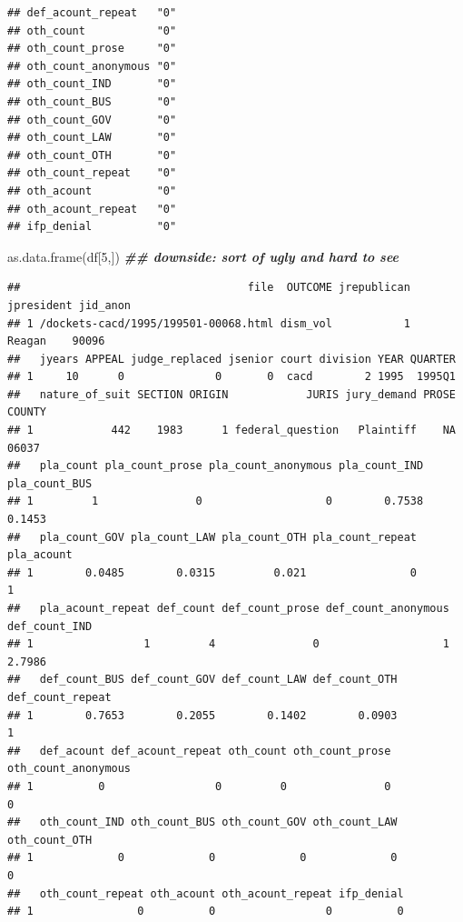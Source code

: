 \documentclass[
]{article}
\newenvironment{Shaded}{\begin{snugshade}}{\end{snugshade}}
\newcommand{\DecValTok}[1]{\textcolor[rgb]{0.00,0.00,0.81}{#1}}
\newcommand{\DocumentationTok}[1]{\textcolor[rgb]{0.56,0.35,0.01}{\textbf{\textit{#1}}}}
\newcommand{\FunctionTok}[1]{\textcolor[rgb]{0.00,0.00,0.00}{#1}}
\newcommand{\NormalTok}[1]{#1}
\begin{document}
\begin{verbatim}
## def_acount_repeat   "0"                                   
## oth_count           "0"                                   
## oth_count_prose     "0"                                   
## oth_count_anonymous "0"                                   
## oth_count_IND       "0"                                   
## oth_count_BUS       "0"                                   
## oth_count_GOV       "0"                                   
## oth_count_LAW       "0"                                   
## oth_count_OTH       "0"                                   
## oth_count_repeat    "0"                                   
## oth_acount          "0"                                   
## oth_acount_repeat   "0"                                   
## ifp_denial          "0"
\end{verbatim}

\begin{Shaded}
\begin{Highlighting}[]
\FunctionTok{as.data.frame}\NormalTok{(df[}\DecValTok{5}\NormalTok{,]) }\DocumentationTok{\#\# downside: sort of ugly and hard to see}
\end{Highlighting}
\end{Shaded}

\begin{verbatim}
##                                   file  OUTCOME jrepublican jpresident jid_anon
## 1 /dockets-cacd/1995/199501-00068.html dism_vol           1     Reagan    90096
##   jyears APPEAL judge_replaced jsenior court division YEAR QUARTER
## 1     10      0              0       0  cacd        2 1995  1995Q1
##   nature_of_suit SECTION ORIGIN            JURIS jury_demand PROSE COUNTY
## 1            442    1983      1 federal_question   Plaintiff    NA  06037
##   pla_count pla_count_prose pla_count_anonymous pla_count_IND pla_count_BUS
## 1         1               0                   0        0.7538        0.1453
##   pla_count_GOV pla_count_LAW pla_count_OTH pla_count_repeat pla_acount
## 1        0.0485        0.0315         0.021                0          1
##   pla_acount_repeat def_count def_count_prose def_count_anonymous def_count_IND
## 1                 1         4               0                   1        2.7986
##   def_count_BUS def_count_GOV def_count_LAW def_count_OTH def_count_repeat
## 1        0.7653        0.2055        0.1402        0.0903                1
##   def_acount def_acount_repeat oth_count oth_count_prose oth_count_anonymous
## 1          0                 0         0               0                   0
##   oth_count_IND oth_count_BUS oth_count_GOV oth_count_LAW oth_count_OTH
## 1             0             0             0             0             0
##   oth_count_repeat oth_acount oth_acount_repeat ifp_denial
## 1                0          0                 0          0
\end{verbatim}
\end{document}

